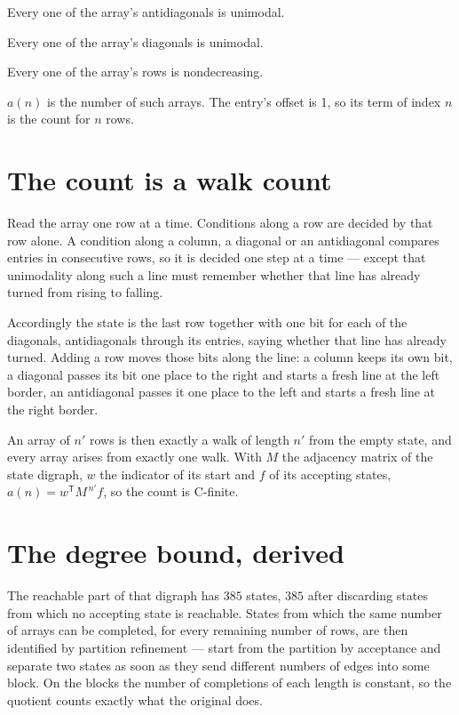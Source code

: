 \documentclass[11pt]{article}
\theoremstyle{definition}
\begin{document}
Every one of the array's antidiagonals is unimodal.

Every one of the array's diagonals is unimodal.

Every one of the array's rows is nondecreasing.

$a(n)$ is the number of such arrays. The entry's offset is 1, so its term of index $n$ is the count for $n$ rows.

\section{The count is a walk count}

Read the array one row at a time. Conditions along a row are decided by that row alone. A condition along a column, a diagonal or an antidiagonal compares entries in consecutive rows, so it is decided one step at a time --- except that unimodality along such a line must remember whether that line has already turned from rising to falling.

Accordingly the state is the last row together with one bit for each of the diagonals, antidiagonals through its entries, saying whether that line has already turned. Adding a row moves those bits along the line: a column keeps its own bit, a diagonal passes its bit one place to the right and starts a fresh line at the left border, an antidiagonal passes it one place to the left and starts a fresh line at the right border.

An array of $n'$ rows is then exactly a walk of length $n'$ from the empty state, and every array arises from exactly one walk. With $M$ the adjacency matrix of the state digraph, $w$ the indicator of its start and $f$ of its accepting states, $a(n) = w^{\mathsf T}M^{\,n'}f$, so the count is C-finite.

\section{The degree bound, derived}

The reachable part of that digraph has $385$ states, $385$ after discarding states from which no accepting state is reachable. States from which the same number of arrays can be completed, for every remaining number of rows, are then identified by partition refinement --- start from the partition by acceptance and separate two states as soon as they send different numbers of edges into some block. On the blocks the number of completions of each length is constant, so the quotient counts exactly what the original does.
\end{document}
